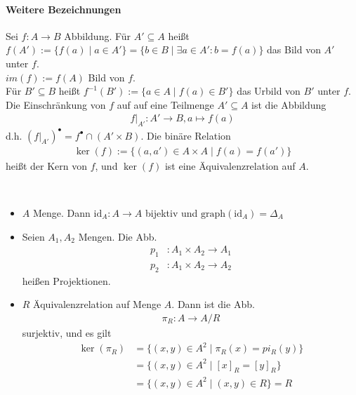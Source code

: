 \paragraph{Weitere Bezeichnungen} Sei $f:A\to B$ Abbildung. Für $A'\subseteq A$ heißt $f(A'):=\{f(a)\mid a\in
	A'\}=\{b \in B\mid \exists a \in A': b=f(a)\}$ das Bild von $A'$ unter $f$.\\
$im(f):=f(A)$ Bild von $f$.\\ Für $B' \subseteq B$ heißt $f^{-1}(B'):=\{a\in
	A\mid f(a)\in B'\}$ das Urbild von $B'$ unter $f$.\\ Die Einschränkung von $f$
auf auf eine Teilmenge $A'\subseteq A$ ist die Abbildung
\begin{align*}
	f|_{A'}:A'\to B, a \mapsto f(a)
\end{align*}
d.h. $(f|_{A'})^{\bullet}=f^{\bullet} \cap (A'\times B)$. Die binäre Relation
\begin{align*}
	\ker(f):=\{(a,a')\in A \times A\mid f(a)=f(a')\}
\end{align*}
heißt der Kern von $f$, und $\ker(f)$ ist eine Äquivalenzrelation auf $A$.
\begin{example}\
	\begin{itemize}
		\item $A$ Menge. Dann $\mathrm{id}_A: A \to A$ bijektiv und $\mathrm{graph}(\mathrm{id}_A)=\Delta_A$
		\item Seien $A_1, A_2$ Mengen. Die Abb. \begin{align*}
			      p_1 & : A_1 \times A_2 \to A_1 \\
			      p_2 & : A_1 \times A_2 \to A_2
		      \end{align*}
		      heißen Projektionen.
		\item $R$ Äquivalenzrelation auf Menge $A$. Dann ist die Abb.
		      \begin{align*}
			      \pi_R: A \to A/R
		      \end{align*}
		      surjektiv, und es gilt \begin{align*}
			      \ker(\pi_R) & =\{(x,y)\in A^2\mid \pi_R(x)=pi_R(y)\} \\
			                  & =\{(x,y)\in A^2\mid [x]_R=[y]_R\}      \\
			                  & =\{(x,y)\in A^2\mid (x,y)\in R\}=R
		      \end{align*}
	\end{itemize}
\end{example}
